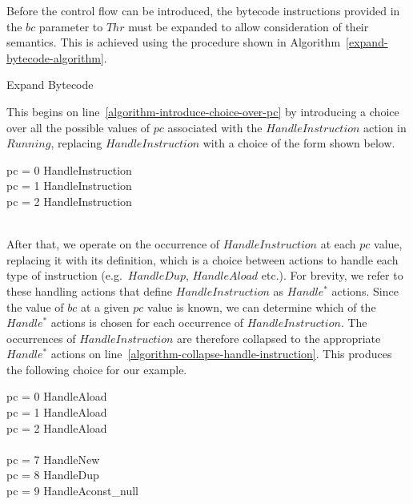 Before the control flow can be introduced, the bytecode instructions
provided in the $bc$ parameter to $Thr$ must be expanded to allow
consideration of their semantics.
This is achieved using the procedure shown in
Algorithm~\ref{expand-bytecode-algorithm}.
\begin{algorithm}
  \begin{algorithmic}[1]
    \State {} \label{algorithm-introduce-choice-over-pc}
    \State {} \label{algorithm-collapse-handle-instruction}
    \State {} \label{algorithm-expand-handle-action}
    \EndFor
    \EndProcedure
  \end{algorithmic}
  \caption{Expand Bytecode}
  \label{expand-bytecode-algorithm}
\end{algorithm}
This begins on line~\ref{algorithm-introduce-choice-over-pc} by
introducing a choice over all the possible values of $pc$ associated
with the $HandleInstruction$ action in $Running$, replacing
$HandleInstruction$ with a choice of the form shown below.
\begin{circus}
  \circif pc = 0 \circthen HandleInstruction \\
  {} \circelse pc = 1 \circthen HandleInstruction \\
  {} \circelse pc = 2 \circthen HandleInstruction \\
  {} \cdots {} \\
  \circfi
\end{circus}
After that, we operate on the occurrence of $HandleInstruction$ at
each $pc$ value, replacing it with its definition, which is a choice
between actions to handle each type of instruction (e.g.\ $HandleDup$,
$HandleAload$ etc.).
For brevity, we refer to these handling actions that define
$HandleInstruction$ as $Handle^*$ actions.
Since the value of $bc$ at a given $pc$ value is known, we can
determine which of the $Handle^*$ actions is chosen for each
occurrence of $HandleInstruction$.
The occurrences of $HandleInstruction$ are therefore collapsed to the
appropriate $Handle^*$ actions on line~\ref{algorithm-collapse-handle-instruction}.
This produces the following choice for our example.
\begin{circus}
  \circif pc = 0 \circthen HandleAload \\
  {} \circelse pc = 1 \circthen HandleAload \\
  {} \circelse pc = 2 \circthen HandleAload \\
  {} \cdots {} \\
  {} \circelse pc = 7 \circthen HandleNew \\
  {} \circelse pc = 8 \circthen HandleDup \\
  {} \circelse pc = 9 \circthen HandleAconst\_null \\
  {} \cdots {} \\
  \circfi
\end{circus}
